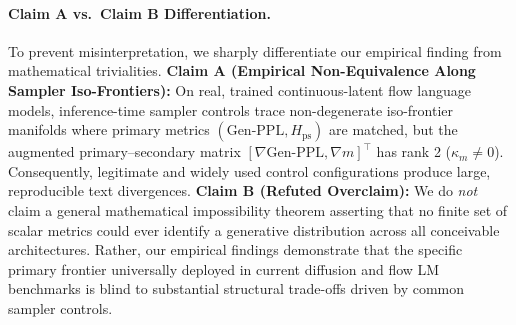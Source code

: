 \documentclass[11pt,a4paper]{article}
\begin{document}
\paragraph{Claim A vs.\ Claim B Differentiation.}
To prevent misinterpretation, we sharply differentiate our empirical finding from mathematical trivialities. \textbf{Claim A (Empirical Non-Equivalence Along Sampler Iso-Frontiers):} On real, trained continuous-latent flow language models, inference-time sampler controls trace non-degenerate iso-frontier manifolds where primary metrics $(\text{Gen-PPL}, H_{\mathrm{ps}})$ are matched, but the augmented primary--secondary matrix $[\nabla\mathrm{Gen\text{-}PPL}, \nabla m]^\top$ has rank 2 ($\kappa_m \neq 0$). Consequently, legitimate and widely used control configurations produce large, reproducible text divergences. \textbf{Claim B (Refuted Overclaim):} We do \emph{not} claim a general mathematical impossibility theorem asserting that no finite set of scalar metrics could ever identify a generative distribution across all conceivable architectures. Rather, our empirical findings demonstrate that the specific primary frontier universally deployed in current diffusion and flow LM benchmarks is blind to substantial structural trade-offs driven by common sampler controls.
\end{document}
